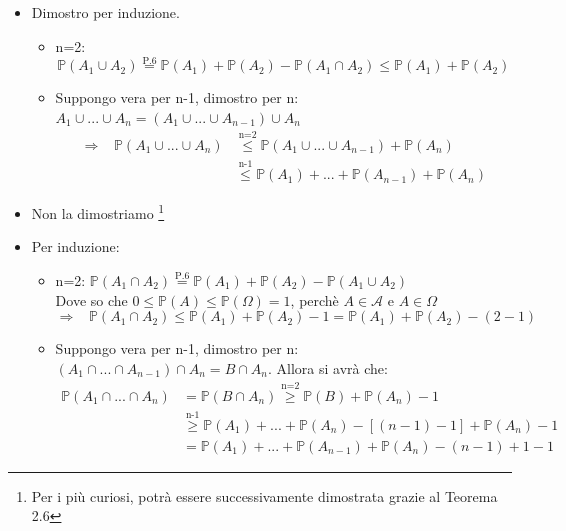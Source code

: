 \begin{dimostrazione}
\begin{itemize}
        \item [P.7)] Dimostro per induzione.\\
        \begin{itemize}
            \item n=2:
            \[\mathbb{P}(A_1 \cup A_2) \overset{\text{P.6}}{=} \mathbb{P}(A_1) + \mathbb{P}(A_2)-\mathbb{P}(A_1\cap A_2) \leq \mathbb{P}(A_1) + \mathbb{P}(A_2) \]
            \item Suppongo vera per n-1, dimostro per n:
            \(A_1 \cup...\cup A_n = (A_1 \cup ... \cup A_{n-1}) \cup A_n\)
            \begin{align*}
                \Rightarrow\;\;\; \mathbb{P}(A_1 \cup...\cup A_n) 
                &\overset{\text{n=2}}{\leq} \mathbb{P}(A_1 \cup ... \cup A_{n-1}) + \mathbb{P}(A_n) \\
                & \overset{\text{n-1}}{\leq} \mathbb{P}(A_1) + ... + \mathbb{P}(A_{n-1}) + \mathbb{P}(A_n)
            \end{align*}
        \end{itemize}
        \item [P.8)] Non la dimostriamo \footnote{Per i più curiosi, potrà essere successivamente dimostrata grazie al Teorema 2.6}
        \item [P.9)] Per induzione:
        \begin{itemize}
            \item n=2: \(\mathbb{P}(A_1 \cap A_2) \overset{\text{P.6}}{=} \mathbb{P}(A_1) + \mathbb{P}(A_2) - \mathbb{P}(A_1 \cup A_2)\)\\
            Dove so che $0 \leq \mathbb{P}(A)\leq \mathbb{P}(\Omega) =1$, perchè $A\in\mathcal{A}$ e $A \in \Omega$
            \[\Rightarrow\;\;\; \mathbb{P}(A_1\cap A_2) \leq \mathbb{P}(A_1) + \mathbb{P}(A_2) -1 = \mathbb{P}(A_1) + \mathbb{P}(A_2) -(2-1)\]
            \item Suppongo vera per n-1, dimostro per n: $(A_1 \cap ...\cap A_{n-1}) \cap A_n = B\cap A_n$.
            Allora si avrà che:
            \begin{align*}
                \mathbb{P}(A_1 \cap ...\cap A_{n}) &= 
                \mathbb{P}(B\cap A_n) \overset{\text{n=2}}{\geq} \mathbb{P}(B) + \mathbb{P}(A_n)-1  \\
                &\overset{\text{n-1}}{\geq} \mathbb{P}(A_1)+...+\mathbb{P}(A_n) - [(n-1)-1] + \mathbb{P}(A_n)-1 \\
                &= \mathbb{P}(A_1)+...+\mathbb{P}(A_{n-1}) + \mathbb{P}(A_n) - (n-1)+1-1
            \end{align*}
            
        \end{itemize}
    \end{itemize}
\end{dimostrazione}

